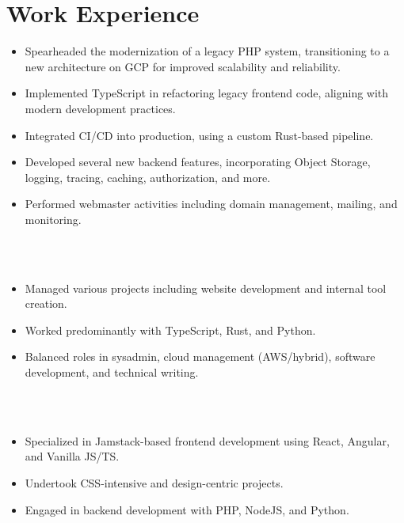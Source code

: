 \documentclass[11pt,a4paper,sans]{moderncv}
\begin{document}
\section{Work Experience}
{
{
	
\begin{itemize}
	\item Spearheaded the modernization of a legacy PHP system, transitioning to a new architecture on GCP for improved scalability and reliability.
	\item Implemented TypeScript in refactoring legacy frontend code, aligning with modern development practices.
	\item Integrated CI/CD into production, using a custom Rust-based pipeline.
	\item Developed several new backend features, incorporating Object Storage, logging, tracing, caching, authorization, and more.
	\item Performed webmaster activities including domain management, mailing, and monitoring.
\end{itemize}
 } \hfill \\[-1em]
\hfill \\

{
\begin{itemize}
	\item Managed various projects including website development and internal tool creation.
	\item Worked predominantly with TypeScript, Rust, and Python.
	\item Balanced roles in sysadmin, cloud management (AWS/hybrid), software development, and technical writing.
\end{itemize}	
} \hfill \\[-1em]
\hfill \\

{
	\begin{itemize}
		\item Specialized in Jamstack-based frontend development using React, Angular, and Vanilla JS/TS.
		\item Undertook CSS-intensive and design-centric projects.
		\item Engaged in backend development with PHP, NodeJS, and Python.
	\end{itemize}	
} \hfill \\[-1.5em]
\hfill \\


}
\end{document}
